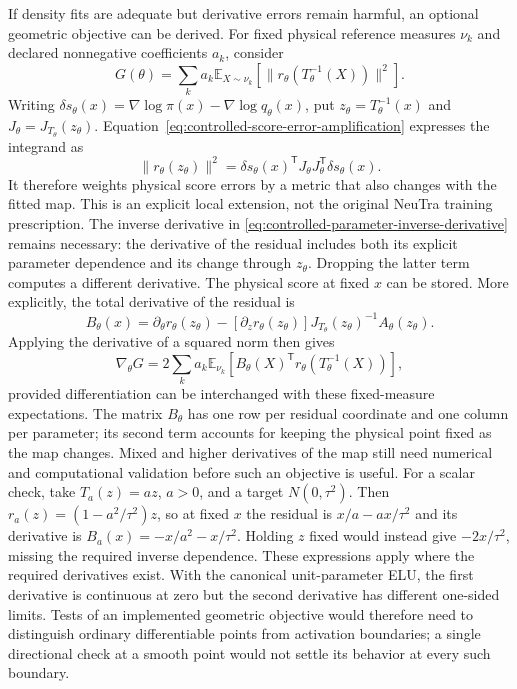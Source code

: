 If density fits are adequate but derivative errors remain harmful, an optional
geometric objective can be derived. For fixed physical reference measures
$\nu_k$ and declared nonnegative coefficients $a_k$, consider
\begin{equation}
 G(\theta)=\sum_k a_k\mathbb E_{X\sim\nu_k}
   \left[\|r_\theta(T_\theta^{-1}(X))\|^2\right].
 \label{eq:controlled-geometric-objective}
\end{equation}
Writing $\delta s_\theta(x)=\nabla\log\pi(x)-\nabla\log q_\theta(x)$,
put $z_\theta=T_\theta^{-1}(x)$ and $J_\theta=J_{T_\theta}(z_\theta)$.
Equation~\eqref{eq:controlled-score-error-amplification} expresses the
integrand as
\begin{equation}
 \|r_\theta(z_\theta)\|^2
 =\delta s_\theta(x)^\mathsf T J_\theta J_\theta^\mathsf T
      \delta s_\theta(x).
\end{equation}
It therefore weights physical score errors by a metric that also changes with
the fitted map.
This is an explicit local extension, not the original NeuTra training
prescription. The inverse derivative in
\eqref{eq:controlled-parameter-inverse-derivative} remains necessary: the
derivative of the residual includes both its explicit parameter dependence
and its change through $z_\theta$. Dropping the latter
term computes a different derivative. The physical score at fixed $x$ can be
stored. More explicitly, the total derivative of the residual is
\begin{equation}
 B_\theta(x)
 =\partial_\theta r_\theta(z_\theta)
  -[\partial_z r_\theta(z_\theta)]
       J_{T_\theta}(z_\theta)^{-1}A_\theta(z_\theta).
\end{equation}
Applying the derivative of a squared norm then gives
\begin{equation}
 \nabla_\theta G
 =2\sum_k a_k\mathbb E_{\nu_k}
       [B_\theta(X)^\mathsf T r_\theta(T_\theta^{-1}(X))],
 \label{eq:controlled-geometric-gradient}
\end{equation}
provided differentiation can be interchanged with these fixed-measure
expectations. The matrix $B_\theta$ has one row per residual coordinate and
one column per parameter; its second term accounts for keeping the physical
point fixed as the map changes. Mixed and higher derivatives of the map still
need numerical and computational validation before such an objective is
useful. For a scalar check, take $T_a(z)=az$, $a>0$, and a target
$N(0,\tau^2)$. Then $r_a(z)=(1-a^2/\tau^2)z$, so at fixed $x$
the residual is $x/a-ax/\tau^2$ and its derivative is
$B_a(x)=-x/a^2-x/\tau^2$. Holding $z$ fixed would instead give
$-2x/\tau^2$, missing the required inverse dependence. These expressions
apply where the required derivatives exist. With the canonical unit-parameter
ELU, the first derivative is continuous at zero but the second derivative has
different one-sided limits. Tests of an implemented geometric objective would
therefore need to distinguish ordinary differentiable points from activation
boundaries; a single directional check at a smooth point would not settle its
behavior at every such boundary.

